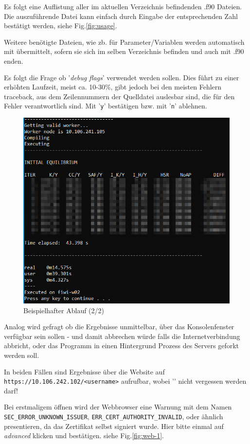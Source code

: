 \documentclass[11pt, a4paper]{article}
\begin{document}
Es folgt eine Auflistung aller im aktuellen Verzeichnis befindenden .f90 Dateien.
Die auszuführende Datei kann einfach durch Eingabe der entsprechenden Zahl bestätigt werden, siehe Fig.\ref{fig:usage}.

Weitere benötigte Dateien, wie zb. für Parameter/Variablen werden automatisch mit übermittelt, sofern sie sich im selben Verzeichnis befinden und auch mit .f90 enden.

Es folgt die Frage ob '\emph{debug flags}' verwendet werden sollen.
Dies führt zu einer erhöhten Laufzeit, meist ca. 10-30\%, gibt jedoch bei den meisten Fehlern traceback, aus dem Zeilennummern der Quelldatei auslesbar sind, die für den Fehler verantwortlich sind.
Mit '\texttt{y}' bestätigen bzw. mit '\texttt{n}' ablehnen.

\begin{figure}[h]
    \centering
    \includegraphics[width=0.7\linewidth]{./pics/2022-03-09_00-05.png}
    \caption{Beispielhafter Ablauf (2/2)}
    \label{fig:usage-full}
\end{figure}

Analog wird gefragt ob die Ergebnisse unmittelbar, über das Konsolenfenster verfügbar sein sollen - und damit abbrechen würde falls die Internetverbindung abbricht, oder das Programm in einen Hintergrund Prozess des Servers geforkt werden soll.

In beiden Fällen sind Ergebnisse über die Website auf \texttt{https://10.106.242.102/\raisebox{0.5ex}{\texttildelow}<username>} aufrufbar, wobei '\texttt{\raisebox{0.5ex}{\texttildelow}}' nicht vergessen werden darf!

Bei erstmaligem öffnen wird der Webbrowser eine Warnung mit dem Namen \texttt{SEC\_ERROR\_UNKNOWN\_ISSUER}, \texttt{ERR\_CERT\_AUTHORITY\_INVALID}, oder ähnlich presentieren, da das Zertifikat selbst signiert wurde.
Hier bitte einmal auf \emph{advanced} klicken und bestätigen.
siehe Fig.\ref{fig:web-1}.
\end{document}
